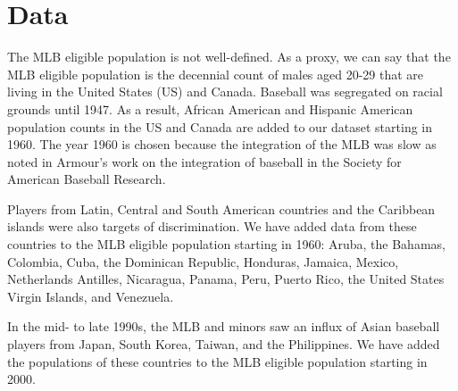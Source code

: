 \documentclass[11pt]{article}\usepackage[]{graphicx}\usepackage[]{color}
\begin{document}


\section{Data}




The MLB eligible population is not well-defined.  As a proxy, we can say 
that the MLB eligible population is the decennial count of males aged 
20-29 that are living in the United States (US) 
and Canada. 
Baseball was segregated on racial grounds until 1947.  As a result, 
African American and Hispanic American population counts in the US  
and Canada are added to our dataset starting in 1960.  The year 1960 is chosen 
because the integration of the MLB was slow as noted in Armour's work on the 
integration of baseball in the Society for American Baseball Research.


Players from Latin, Central and South American countries and the Caribbean 
islands were also targets of discrimination.
We have added data from these countries to the MLB eligible population starting 
in 1960:
Aruba,
the Bahamas, 
Colombia, 
Cuba, 
the Dominican Republic, 
Honduras, 
Jamaica, 
Mexico, 
Netherlands Antilles, 
Nicaragua, 
Panama, 
Peru, 
Puerto Rico, 
the United States Virgin Islands, 
and Venezuela.  

In the mid- to late 1990s, the MLB and minors saw an influx of Asian baseball 
players from Japan, South Korea, Taiwan, and the Philippines.  
We have added the populations of these countries to the MLB eligible population 
starting in 2000.  %
\end{document}
